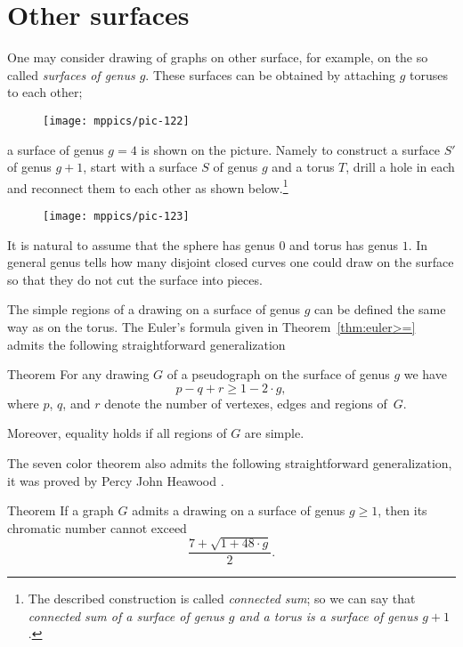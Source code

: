 \section*{Other surfaces}

One may consider drawing of graphs on other surface,
for example, on the so called \emph{surfaces of genus $g$}.
These surfaces can be obtained by attaching $g$ toruses to each other; 
\begin{figure}[h!]%
\vskip-0mm
\centering
\texttt{[image: mppics/pic-122]}
\vskip-0mm
\end{figure}
a surface of genus $g=4$ is shown on the picture.
Namely to construct a surface $S'$ of genus $g+1$, start with a surface $S$ of genus $g$ and a torus $T$, drill a hole in each and reconnect them to each other as shown below.\footnote{The described construction is called \emph{connected sum}; so we can say that {}\emph{connected sum of a surface of genus $g$ and a torus is a surface of genus $g+1$}.}
\begin{figure}[h!]%
\vskip-0mm
\centering
\texttt{[image: mppics/pic-123]}
\vskip-0mm
\end{figure}


It is natural to assume that the sphere has genus $0$ and torus has genus $1$.
In general genus tells how many disjoint closed curves one could draw on the surface so that they do not cut the surface into pieces.

The simple regions of a drawing on a surface of genus $g$ can be defined the same way as on the torus.
The Euler's formula given in Theorem~\ref{thm:euler>=} admits the following straightforward generalization

\begin{thm}{Theorem}\label{thm:euler>=}
For any drawing $G$ of a pseudograph on the surface of genus $g$ we have
\[p-q+r\ge 1-2\cdot g,\]
where $p$, $q$, and $r$ denote the number of vertexes, edges and regions of~$G$.

Moreover, equality holds if all regions of $G$ are simple.
\end{thm}

The seven color theorem also admits the following straightforward generalization, it was proved by Percy John Heawood \cite{heawood}.

\begin{thm}{Theorem}
If a graph $G$ admits a drawing on a surface of genus $g\ge 1$, 
then its chromatic number cannot exceed 
\[\frac{7+\sqrt{1+48\cdot g}}2.\]
\end{thm}

